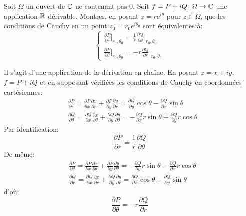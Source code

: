 \documentclass[a4paper, 12pt]{amsart}
\begin{document}
\begin{fex}
Soit $\Omega$ un ouvert de $\mathbb{C}$ ne contenant pas $0.$ Soit $f=P + i Q \colon \Omega \to \mathbb{C}$ une application $\mathbb{R}$ dérivable. Montrer, en posant $z=re^{i\theta}$ pour $z \in \Omega$, que les conditions de Cauchy en un point $z_0 = r_0 e^{i \theta_0}$ sont équivalentes à:
\[
\begin{cases}
    \frac{\partial P}{\partial r}\vert_{r_0,\theta_0} = \frac{1}{r}\frac{\partial Q}{\partial \theta}\vert_{r_0,\theta_0} \\
    \frac{\partial P}{\partial \theta}\vert_{r_0,\theta_0} =- r\frac{\partial Q}{\partial r}\vert_{r_0,\theta_0}
\end{cases}
\]
\end{fex}
Il s'agit d'une application de la dérivation en chaîne. En posant $z = x + i y$, $f = P + i Q$ 
et en supposant vérifiées les conditions de Cauchy en coordonnées cartésiennes:
\begin{equation}
\begin{split}
    & \frac{\partial P}{\partial r} = \frac{\partial P}{\partial x}\frac{\partial x}{\partial r} +\frac{\partial P}{\partial y}\frac{\partial y}{\partial r}
    = \frac{\partial Q}{\partial y} \cos \theta -\frac{\partial Q}{\partial x} \sin \theta\\
    & \frac{\partial Q}{\partial \theta} = \frac{\partial Q}{\partial x}\frac{\partial x}{\partial \theta} + \frac{\partial Q}{\partial y}\frac{\partial y}{\partial \theta} = -\frac{\partial Q}{\partial x} r \sin\theta + \frac{\partial Q}{\partial y} r \cos \theta
\end{split}
\end{equation}
Par identification:
\[
\frac{\partial P}{\partial r} = \frac{1}{r}\frac{\partial Q}{\partial \theta}
\]
De même:
\begin{equation}
\begin{split}
    & \frac{\partial P}{\partial \theta} = \frac{\partial P}{\partial x}\frac{\partial x}{\partial \theta} +\frac{\partial P}{\partial y}\frac{\partial y}{\partial \theta}
    = - \frac{\partial Q}{\partial y} r \sin \theta -\frac{\partial Q}{\partial x} r \cos \theta\\
    & \frac{\partial Q}{\partial r} = \frac{\partial Q}{\partial x}\frac{\partial x}{\partial r} + \frac{\partial Q}{\partial y}\frac{\partial y}{\partial r} = \frac{\partial Q}{\partial x}  \cos \theta + \frac{\partial Q}{\partial y} \sin \theta
\end{split}
\end{equation}
d'où:
\[
\frac{\partial P}{\partial \theta} = -r \frac{\partial Q}{\partial r}
\]
\end{document}

